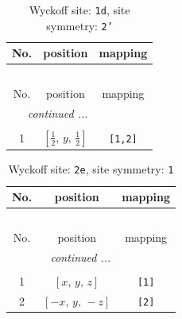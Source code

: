 \documentclass[fleqn,8pt]{jsarticle}
\begin{document}
\renewcommand{\arraystretch}{1.2}
\begin{longtable}{ccc}
\caption{Wyckoff site: {\tt 1d}, site symmetry: {\tt 2'}}
 \\
 \hline \hline
No. & position & mapping \\ \hline \endfirsthead

\multicolumn{2}{l}{\tablename\ \thetable{}} \\
 \hline \hline
No. & position & mapping \\ \hline \endhead

 \hline \hline
\multicolumn{2}{r}{\footnotesize\it continued ...} \\ \endfoot

 \hline \hline
\multicolumn{2}{r}{} \\ \endlastfoot

1 & $\left[ \frac{1}{2},\, y,\, \frac{1}{2} \right]$ & {\tt [1,2]} \\
\end{longtable}
\renewcommand{\arraystretch}{1.2}
\begin{longtable}{ccc}
\caption{Wyckoff site: {\tt 2e}, site symmetry: {\tt 1}}
 \\
 \hline \hline
No. & position & mapping \\ \hline \endfirsthead

\multicolumn{2}{l}{\tablename\ \thetable{}} \\
 \hline \hline
No. & position & mapping \\ \hline \endhead

 \hline \hline
\multicolumn{2}{r}{\footnotesize\it continued ...} \\ \endfoot

 \hline \hline
\multicolumn{2}{r}{} \\ \endlastfoot

1 & $\left[ x,\, y,\, z \right]$ & {\tt [1]} \\ \hline
2 & $\left[ - x,\, y,\, - z \right]$ & {\tt [2]} \\
\end{longtable}
\end{document}
